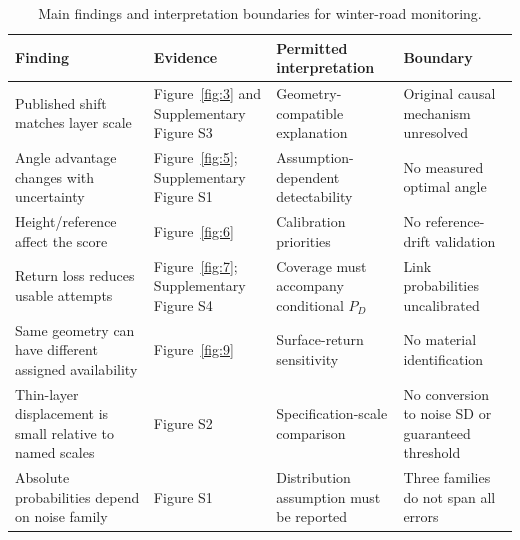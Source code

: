 \begin{table}[htbp]
\caption{Main findings and interpretation boundaries for winter-road monitoring.}\label{tab:7}
\small\setlength{\tabcolsep}{3pt}\renewcommand{\arraystretch}{1.15}
\begin{tabularx}{\linewidth}{>{\raggedright\arraybackslash}X>{\raggedright\arraybackslash}X>{\raggedright\arraybackslash}X>{\raggedright\arraybackslash}X}
\toprule
Finding & Evidence & Permitted interpretation & Boundary \\
\midrule
Published shift matches layer scale & Figure~\ref{fig:3} and Supplementary Figure S3 & Geometry-compatible explanation & Original causal mechanism unresolved \\
Angle advantage changes with uncertainty & Figure~\ref{fig:5}; Supplementary Figure S1 & Assumption-dependent detectability & No measured optimal angle \\
Height/reference affect the score & Figure~\ref{fig:6} & Calibration priorities & No reference-drift validation \\
Return loss reduces usable attempts & Figure~\ref{fig:7}; Supplementary Figure S4 & Coverage must accompany conditional $P_D$ & Link probabilities uncalibrated \\
Same geometry can have different assigned availability & Figure~\ref{fig:9} & Surface-return sensitivity & No material identification \\
Thin-layer displacement is small relative to named scales & Figure S2 & Specification-scale comparison & No conversion to noise SD or guaranteed threshold \\
Absolute probabilities depend on noise family & Figure S1 & Distribution assumption must be reported & Three families do not span all errors \\
\bottomrule
\end{tabularx}
\end{table}
